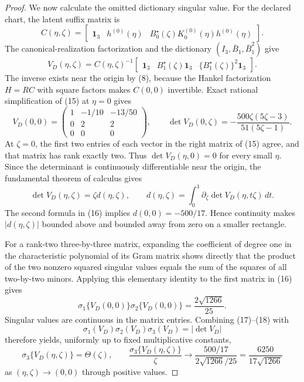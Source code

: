 \documentclass{article}
\begin{document}
\begin{proof}
We now calculate the omitted dictionary singular value. For the declared chart, the latent suffix matrix is
\[
 C(\eta,\zeta)
 =\begin{bmatrix}
 \mathbf 1_3&h^{(0)}(\eta)&B_0^{\star}(\zeta)K_0^{(0)}(\eta)h^{(0)}(\eta)
 \end{bmatrix}.                                               \tag{14}
\]
The canonical-realization factorization and the dictionary \((I_3,\bar B_1,\bar B_1^2)\) give
\[
 V_D(\eta,\zeta)
 =C(\eta,\zeta)^{-1}
 \begin{bmatrix}
 \mathbf 1_3&B_1^{\star}(\zeta)\mathbf 1_3&
 \{B_1^{\star}(\zeta)\}^2\mathbf 1_3
 \end{bmatrix}.                                               \tag{15}
\]
The inverse exists near the origin by (8), because the Hankel factorization \(H=RC\) with square factors makes \(C(0,0)\) invertible. Exact rational simplification of (15) at \(\eta=0\) gives
\[
 V_D(0,0)=
 \begin{pmatrix}1&-1/10&-13/50\\0&2&2\\0&0&0\end{pmatrix},
 \qquad
 \det V_D(0,\zeta)
 =-\frac{500\zeta(5\zeta-3)}{51(5\zeta-1)}.                 \tag{16}
\]
At \(\zeta=0\), the first two entries of each vector in the right matrix of (15) agree, and that matrix has rank exactly two. Thus \(\det V_D(\eta,0)=0\) for every small \(\eta\). Since the determinant is continuously differentiable near the origin, the fundamental theorem of calculus gives
\[
 \det V_D(\eta,\zeta)=\zeta d(\eta,\zeta),
 \qquad
 d(\eta,\zeta)=\int_0^1
 \partial_{\zeta}\det V_D(\eta,t\zeta)\,dt.                \tag{17}
\]
The second formula in (16) implies \(d(0,0)=-500/17\). Hence continuity makes \(|d(\eta,\zeta)|\) bounded above and bounded away from zero on a smaller rectangle.

For a rank-two three-by-three matrix, expanding the coefficient of degree one in the characteristic polynomial of its Gram matrix shows directly that the product of the two nonzero squared singular values equals the sum of the squares of all two-by-two minors. Applying this elementary identity to the first matrix in (16) gives
\[
 \sigma_1\{V_D(0,0)\}\sigma_2\{V_D(0,0)\}
 =\frac{2\sqrt{1266}}{25}.                                   \tag{18}
\]
Singular values are continuous in the matrix entries. Combining (17)--(18) with
\[
 \sigma_1(V_D)\sigma_2(V_D)\sigma_3(V_D)=|\det V_D|          \tag{19}
\]
therefore yields, uniformly up to fixed multiplicative constants,
\[
 \sigma_3\{V_D(\eta,\zeta)\}=\Theta(\zeta),
 \qquad
 \frac{\sigma_3\{V_D(\eta,\zeta)\}}{\zeta}
 \longrightarrow
 \frac{500/17}{2\sqrt{1266}/25}
 =\frac{6250}{17\sqrt{1266}}                                 \tag{20}
\]
as \((\eta,\zeta)\to(0,0)\) through positive values.


\end{proof}
\end{document}
